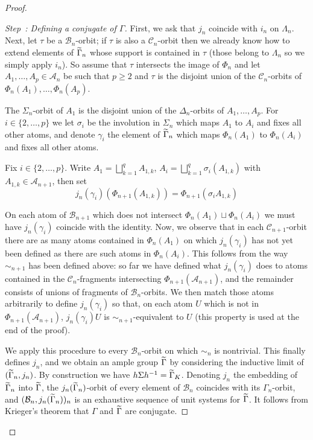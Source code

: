 \documentclass[10pt,a4paper]{article}
\theoremstyle{definition}
\newcommand{\mcA}{\mathcal{A}}
\newcommand{\mcB}{\mathcal{B}}
\newcommand{\mcC}{\mathcal{C}}
\let\oldtilde\tilde
\renewcommand*{\tilde}[1]{\mathchoice{\widetilde{#1}}{\widetilde{#1}}{\oldtilde{#1}}{\oldtilde{#1}}}
\newcounter{setofstep}
\newcounter{step}[setofstep]
\newenvironment{step}[1][]{\refstepcounter{step}\begin{proof}[{Step~\thestep\if#1\empty\else: #1\fi}]}{\let\qed\relax\end{proof}}
\begin{document}
\begin{proof}
\begin{step}[{Defining a conjugate of $\Gamma$}]
First, we ask that $j_n$ coincide with $i_n$ on $\Lambda_n$. Next, let $\tau$ be a $\mcB_n$-orbit; if $\tau$ is also a $\mcC_n$-orbit then we already know how to extend elements of $\tilde \Gamma_n$ whose support is contained in $\tau$ (those belong to $\Lambda_n$ so we simply apply $i_n$). So assume that $\tau$ intersects the image of $\Phi_n$ and let $A_1,\dots,A_p \in \mcA_n$ be such that $p \ge 2$ and $\tau$ is the disjoint union of the $\mcC_n$-orbits of $\Phi_n(A_1),\dots,\Phi_n(A_p)$.

The $\Sigma_n$-orbit of $A_1$ is the disjoint union of the $\Delta_n$-orbits of $A_1, \dots,A_p$. For $i \in \{2,\dots,p\}$ we let $\sigma_i$ be the involution in $\Sigma_n$ which maps $A_1$ to $A_i$ and fixes all other atoms, and denote $\gamma_i$ the element of $\tilde \Gamma_n$ which maps $\Phi_n(A_1)$ to $\Phi_n(A_i)$ and fixes all other atoms.

Fix $i \in \{2,\dots,p\}$. Write $A_1=\bigsqcup_{k=1}^q A_{1,k}$, $A_i=\bigsqcup_{k=1}^q \sigma_i(A_{1,k})$ with $A_{1,k} \in \mcA_{n+1}$, then set
\[
j_n(\gamma_i)(\Phi_{n+1}(A_{1,k}))=\Phi_{n+1}(\sigma_i A_{1,k})
\]

On each atom of $\mcB_{n+1}$ which does not intersect $\Phi_n(A_1) \sqcup \Phi_n(A_i)$ we must have $j_n(\gamma_i)$ coincide with the identity. Now, we observe that in each $\mcC_{n+1}$-orbit there are as many atoms contained in $\Phi_{n}(A_1)$ on which $j_n(\gamma_i)$ has not yet been defined as there are such atoms in $\Phi_n(A_i)$. This follows from the way $\sim_{n+1}$ has been defined above: so far we have defined what $j_n(\gamma_i)$ does to atoms contained in the $\mcC_n$-fragments intersecting $\Phi_{n+1}(\mcA_{n+1})$, and the remainder consists of unions of fragments of $\mcB_n$-orbits. We then match those atoms arbitrarily to define $j_n(\gamma_i)$ so that, on each atom $U$ which is not in $\Phi_{n+1}(\mcA_{n+1})$, $j_n(\gamma_i)U$ is $\sim_{n+1}$-equivalent to $U$ (this property is used at the end of the proof).

We apply this procedure to every $\mcB_n$-orbit on which $\sim_n$ is nontrivial. This finally defines $j_n$, and we obtain an ample group $\tilde \Gamma$ by considering the inductive limit of $(\tilde \Gamma_n,j_n)$. By construction we have $h \Sigma h^{-1}= \tilde{\Gamma}_K$. Denoting $j_n$ the embedding of $\tilde \Gamma_n$ into $\tilde \Gamma$, the $j_n(\tilde \Gamma_n)$-orbit of every element of $\mcB_n$ coincides with its $\Gamma_n$-orbit, and $(\mcB_n,j_n(\tilde \Gamma_n))_n$ is an exhaustive sequence of unit systems for $\tilde \Gamma$. It follows from Krieger's theorem that $\Gamma$ and $\tilde \Gamma$ are conjugate.
\end{step}


\end{proof}
\end{document}
